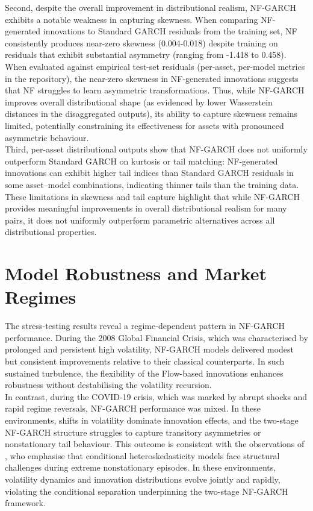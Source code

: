 \documentclass[oneside,12pt]{CUEDthesisPSnPDF}
\newcommand{\textcite}{\citet}
\begin{document}
Second, despite the overall improvement in distributional realism, NF-GARCH exhibits a notable weakness in capturing skewness. When comparing NF-generated innovations to Standard GARCH residuals from the training set, NF consistently produces near-zero skewness (0.004-0.018) despite training on residuals that exhibit substantial asymmetry (ranging from -1.418 to 0.458). When evaluated against empirical test-set residuals (per-asset, per-model metrics in the repository), the near-zero skewness in NF-generated innovations suggests that NF struggles to learn asymmetric transformations. Thus, while NF-GARCH improves overall distributional shape (as evidenced by lower Wasserstein distances in the disaggregated outputs), its ability to capture skewness remains limited, potentially constraining its effectiveness for assets with pronounced asymmetric behaviour.\\

Third, per-asset distributional outputs show that NF-GARCH does not uniformly outperform Standard GARCH on kurtosis or tail matching: NF-generated innovations can exhibit higher tail indices than Standard GARCH residuals in some asset--model combinations, indicating thinner tails than the training data. These limitations in skewness and tail capture highlight that while NF-GARCH provides meaningful improvements in overall distributional realism for many pairs, it does not uniformly outperform parametric alternatives across all distributional properties.\\

\section{Model Robustness and Market Regimes}

\noindent
The stress-testing results reveal a regime-dependent pattern in NF-GARCH performance. During the 2008 Global Financial Crisis, which was characterised by prolonged and persistent high volatility, NF-GARCH models delivered modest but consistent improvements relative to their classical counterparts. In such sustained turbulence, the flexibility of the Flow-based innovations enhances robustness without destabilising the volatility recursion.\\

In contrast, during the COVID-19 crisis, which was marked by abrupt shocks and rapid regime reversals, NF-GARCH performance was mixed. In these environments, shifts in volatility dominate innovation effects, and the two-stage NF-GARCH structure struggles to capture transitory asymmetries or nonstationary tail behaviour. This outcome is consistent with the observations of \textcite{engle2002dynamic}, who emphasise that conditional heteroskedasticity models face structural challenges during extreme nonstationary episodes. In these environments, volatility dynamics and innovation distributions evolve jointly and rapidly, violating the conditional separation underpinning the two-stage NF-GARCH framework.\\
\end{document}
